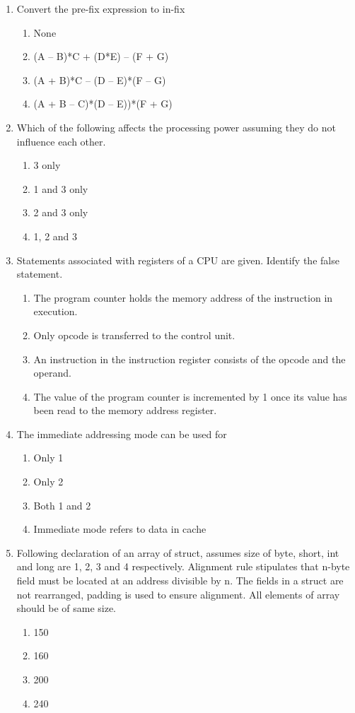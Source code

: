 \documentclass[12pt]{article}
\begin{document}
\begin{enumerate}
\item[46.] Convert the pre-fix expression to in-fix
\begin{enumerate}[label=\Alph*.]
  \item None
  \item (A – B)*C + (D*E) – (F + G)
  \item (A + B)*C – (D – E)*(F – G)
  \item (A + B – C)*(D – E))*(F + G)
\end{enumerate}

\item[47.] Which of the following affects the processing power assuming they do not influence each other.
\begin{enumerate}[label=\Alph*.]
  \item 3 only
  \item 1 and 3 only
  \item 2 and 3 only
  \item 1, 2 and 3
\end{enumerate}

\item[48.] Statements associated with registers of a CPU are given. Identify the false statement.
\begin{enumerate}[label=\Alph*.]
  \item The program counter holds the memory address of the instruction in execution.
  \item Only opcode is transferred to the control unit.
  \item An instruction in the instruction register consists of the opcode and the operand.
  \item The value of the program counter is incremented by 1 once its value has been read to the memory address register.
\end{enumerate}

\item[49.] The immediate addressing mode can be used for
\begin{enumerate}[label=\Alph*.]
  \item Only 1
  \item Only 2
  \item Both 1 and 2
  \item Immediate mode refers to data in cache
\end{enumerate}

\item[50.] Following declaration of an array of struct, assumes size of byte, short, int and long are 1, 2, 3 and 4 respectively. Alignment rule stipulates that n-byte field must be located at an address divisible by n. The fields in a struct are not rearranged, padding is used to ensure alignment. All elements of array should be of same size.
\begin{enumerate}[label=\Alph*.]
  \item 150
  \item 160
  \item 200
  \item 240
\end{enumerate}


\end{enumerate}
\end{document}
